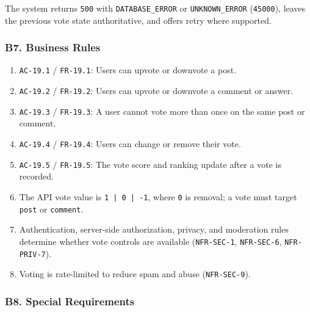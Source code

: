 \documentclass[12pt]{article}
\begin{document}
The system returns \texttt{500} with \texttt{DATABASE\_ERROR} or \texttt{UNKNOWN\_ERROR} (\texttt{45000}), leaves the previous vote state authoritative, and offers retry where supported.
\par\medskip

\hypertarget{sec:b7-business-rules}{}
\subsubsection*{B7. Business Rules}
\par\medskip

\begin{enumerate}
\item \texttt{AC-19.1} / \texttt{FR-19.1}: Users can upvote or downvote a post.
\item \texttt{AC-19.2} / \texttt{FR-19.2}: Users can upvote or downvote a comment or answer.
\item \texttt{AC-19.3} / \texttt{FR-19.3}: A user cannot vote more than once on the same post or comment.
\item \texttt{AC-19.4} / \texttt{FR-19.4}: Users can change or remove their vote.
\item \texttt{AC-19.5} / \texttt{FR-19.5}: The vote score and ranking update after a vote is recorded.
\item The API vote value is \texttt{1 | 0 | -1}, where \texttt{0} is removal; a vote must target \texttt{post} or \texttt{comment}.
\item Authentication, server-side authorization, privacy, and moderation rules determine whether vote controls are available (\texttt{NFR-SEC-1}, \texttt{NFR-SEC-6}, \texttt{NFR-PRIV-7}).
\item Voting is rate-limited to reduce spam and abuse (\texttt{NFR-SEC-9}).
\end{enumerate}
\par\medskip

\hypertarget{sec:b8-special-requirements}{}
\subsubsection*{B8. Special Requirements}
\par\medskip
\end{document}
